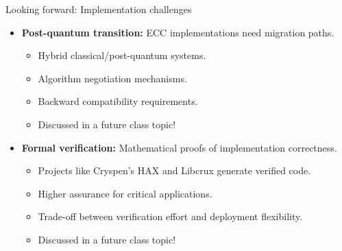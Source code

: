 \documentclass[aspectratio=169, lualatex, handout]{beamer}
\begin{document}
\begin{frame}{Looking forward: Implementation challenges}
	\begin{itemize}[<+->]
		\item \textbf{Post-quantum transition:} ECC implementations need migration paths.
		      \begin{itemize}
			      \item Hybrid classical/post-quantum systems.
			      \item Algorithm negotiation mechanisms.
			      \item Backward compatibility requirements.
			      \item Discussed in a future class topic!
		      \end{itemize}
		\item \textbf{Formal verification:} Mathematical proofs of implementation correctness.
		      \begin{itemize}
			      \item Projects like Cryspen's HAX and Libcrux generate verified code.
			      \item Higher assurance for critical applications.
			      \item Trade-off between verification effort and deployment flexibility.
			      \item Discussed in a future class topic!
		      \end{itemize}
	\end{itemize}
\end{frame}

\begin{frame}[plain]
	\titlepage
\end{frame}
\end{document}
